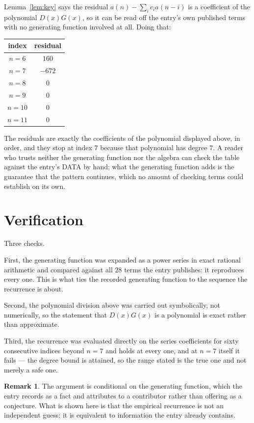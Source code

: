 \documentclass[11pt,a4paper]{article}
\theoremstyle{plain}
\theoremstyle{definition}
\newtheorem{remark}[theorem]{Remark}
\begin{document}
Lemma~\ref{lem:key} says the residual $a(n)-\sum_ic_ia(n-i)$ is a coefficient of the
polynomial $D(x)G(x)$, so it can be read off the entry's own published terms with no
generating function involved at all. Doing that:
\begin{center}
\begin{tabular}{cc}
index & residual \\ \hline
$n=6$ & $160$ \\
$n=7$ & $-672$ \\
$n=8$ & $0$ \\
$n=9$ & $0$ \\
$n=10$ & $0$ \\
$n=11$ & $0$
\end{tabular}
\end{center}
The residuals are exactly the coefficients of the polynomial displayed above, in order, and
they stop at index $7$ because that polynomial has degree $7$. A reader who trusts
neither the generating function nor the algebra can check the table against the entry's DATA
by hand; what the generating function adds is the guarantee that the pattern continues, which
no amount of checking terms could establish on its own.

\section{Verification}

Three checks.

First, the generating function was expanded as a power series in exact rational arithmetic and
compared against all $28$ terms the entry publishes: it reproduces every one. This is
what ties the recorded generating function to the sequence the recurrence is about.

Second, the polynomial division above was carried out symbolically, not numerically, so the
statement that $D(x)G(x)$ is a polynomial is exact rather than approximate.

Third, the recurrence was evaluated directly on the series coefficients for sixty consecutive
indices beyond $n=7$ and holds at every one, and at $n=7$ itself it fails --- the
degree bound is attained, so the range stated is the true one and not merely a safe one.

\begin{remark}
The argument is conditional on the generating function, which the entry records as a fact and
attributes to a contributor rather than offering as a conjecture. What is shown here is that
the empirical recurrence is not an independent guess: it is equivalent to information the
entry already contains.
\end{remark}
\end{document}
